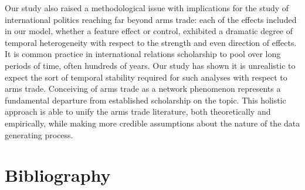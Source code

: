 \documentclass[12pt, letterpaper]{article}
\numberwithin{equation}{section}
\begin{document}
Our study also raised a methodological issue with implications for the study of international politics reaching far beyond arms trade: each of the effects included in our model, whether a feature effect or control, exhibited a dramatic degree of temporal heterogeneity with respect to the strength and even direction of effects. It is common practice in international relations scholarship to pool over long periods of time, often hundreds of years. Our study has shown it is unrealistic to expect the sort of temporal stability required for such analyses with respect to arms trade. 
Conceiving of arms trade as a network phenomenon represents a fundamental departure from established scholarship on the topic. This holistic approach is able to unify the arms trade literature, both theoretically and empirically, while making more credible assumptions about the nature of the data generating process. 

   
\newpage
\section*{Bibliography}
\small

 \nocite{Squaetal:11}
 \nocite{Squaetalb:11}
 \nocite{ArmKor:14}
 \nocite{Arvietal:13}
  \nocite{Hane:84}
   \nocite{Chan:14}

\end{document}
